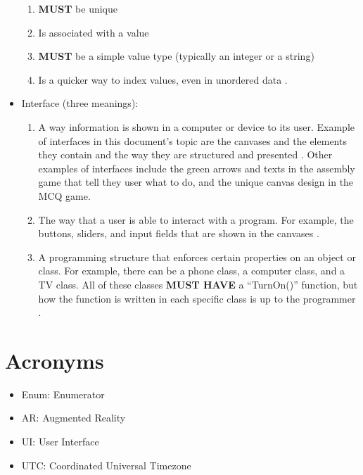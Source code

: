 \documentclass[a4paper, 12pt]{article}
\begin{document}
\begin{itemize}
{        \begin{enumerate}
        
        \item{\textbf{MUST} be unique}
        \item{Is associated with a value}
        \item{\textbf{MUST} be a simple value type (typically an integer or a string)}
        \item{Is a quicker way to index values, even in unordered data \cite{DictionaryMeaning}.}        
        \end{enumerate}        
        }    
    \item{Interface (three meanings):
    \begin{enumerate}
    \item{A way information is shown in a computer or device to its user. Example of interfaces in this document's topic are the canvases and the elements they contain and the way they are structured and presented \cite{InterfaceMeaning}. Other examples of interfaces include the green arrows and texts in the assembly game that tell they user what to do, and the unique canvas design in the \acrshort{MCQ} game.}
    
    \item{The way that a user is able to interact with a program. For example, the buttons, sliders, and input fields that are shown in the canvases \cite{InterfaceMeaning}.}
    
    \item{A programming structure that enforces certain properties on an object or class. For example, there can be a phone class, a computer class, and a TV class. All of these classes \textbf{MUST HAVE} a “{\codefont TurnOn()}” function, but how the function is written in each specific class is up to the programmer \cite{ProgInterfaceMeaning}.}
    
    \end{enumerate}

    }
    
    
 \end{itemize}
\section{Acronyms}

\begin{itemize}
    \item{Enum: Enumerator}
    
    \item{AR: Augmented Reality}
    
    \item{UI: User Interface}
    
    \item{UTC: Coordinated Universal Timezone}
\end{itemize}

\printbibliography
\end{document}

